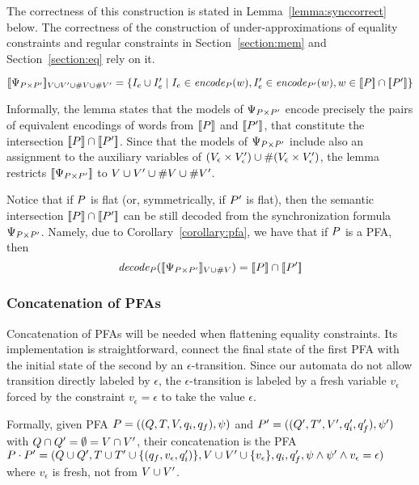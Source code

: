 \documentclass[sigplan,screen]{acmart}
\begin{document}
The correctness of this construction is stated in Lemma~\ref{lemma:synccorrect} below. 
The correctness of the construction of under-approximations of equality constraints and regular constraints in Section~\ref{section:mem} and Section~\ref{section:eq} rely on it. 
%

\begin{lemma}\label{lemma:synccorrect}
$
[\![\Psi_{P \times P'}]\!]_{V\cup V' \cup \#{V}\cup\#{V'}} =
\{I_e\cup I_e'\mid I_e \in \mathit{encode}_{P} (w), I_e'\in\mathit{encode}_{P'} (w), w\in[\![P]\!] \cap [\![P']\!]\} 
$
\end{lemma}

Informally, the lemma states that the models of $\Psi_{P \times P'}$ encode precisely the pairs of equivalent encodings of words from $[\![P]\!]$ and $[\![P']\!]$, that constitute the intersection $[\![P]\!] \cap [\![P']\!]$. 
Since that the models of $\Psi_{P \times P'}$ include also an assignment to the auxiliary variables of $(V_\epsilon\times V'_\epsilon) \cup \#{(V_\epsilon\times V'_\epsilon)}$, the lemma restricts $[\![\Psi_{P \times P'}]\!]$ to ${V\cup V' \cup \#{V}\cup\#{V'}}$. 

Notice that if $P$ is flat (or, symmetrically, if $P'$ is flat), then the semantic intersection $[\![P]\!] \cap [\![P']\!]$ can be still decoded from the synchronization formula $\Psi_{P \times P'}$. 
Namely, due to Corollary~\ref{corollary:pfa}, we have that if $P$ is a PFA, then
$$
\mathit{decode_{P}} ([\![\Psi_{P \times P'}]\!]_{V\cup \#{V}}) = [\![P]\!] \cap [\![P']\!]
$$  

\subsubsection*{Concatenation of PFAs}
Concatenation of PFAs will be needed when flattening equality constraints. Its implementation is straightforward, connect the final state of the first PFA with the initial state of the second by an $\epsilon$-transition. Since our automata do not allow transition directly labeled by $\epsilon$, 
the $\epsilon$-transition is labeled by a fresh variable $v_\epsilon$ forced by the constraint $v_\epsilon = \epsilon$ to take the value $\epsilon$.  

Formally, given PFA $P = ((Q,T,V,q_i,q_f),\psi)$ and ${P'} = ((Q',T',V',q_i',q_f'),\psi')$ with $Q\cap Q'=\emptyset = V\cap V'$, 
their concatenation is the PFA $P\cdot P' = (Q\cup Q',T\cup T'\cup \{(q_f,v_\epsilon,q_i')\},V\cup V'\cup\{v_\epsilon\},q_i,q_f',\psi\land\psi'\land v_\epsilon = \epsilon)$ where $v_\epsilon$ is fresh, not from $V\cup V'$. 
\end{document}
